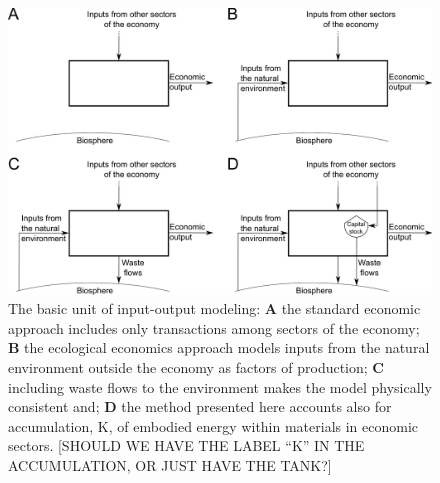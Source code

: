 \begin{figure}[h!]
\centering
\includegraphics[width=\linewidth]{Part_0/Chapter_Introduction/images/Basic_unit_square.pdf}
\caption{The basic unit of input-output modeling: \textbf{A} the standard economic approach includes only transactions among sectors of the economy; \textbf{B} the ecological economics approach models inputs from the natural environment outside the economy as factors of production; \textbf{C} including waste flows to the environment makes the model physically consistent and; \textbf{D} the method presented here accounts also for accumulation, K, of embodied energy within materials in economic sectors. [SHOULD WE HAVE THE LABEL ``K'' IN THE ACCUMULATION, OR JUST HAVE THE TANK?]}
\label{fig:basic_unit}
\end{figure}
%

